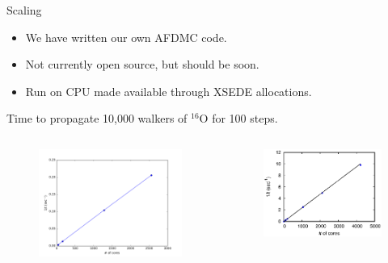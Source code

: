 \documentclass{beamer}
\begin{document}
\begin{frame}{Scaling}
\begin{itemize}
   \item We have written our own AFDMC code.
   \item Not currently open source, but should be soon.
   \item Run on CPU made available through XSEDE allocations.
\end{itemize}
{\small Time to propagate 10,000 walkers of $^{16}$O for 100 steps.}
\vspace{-0.5cm}
\begin{columns}
\begin{column}{0.5\textwidth}
\begin{figure}
   \includegraphics[width=\textwidth]{../figures/supermic.png}
\end{figure}
\end{column}
\hspace{-0.5cm}
\begin{column}{0.5\textwidth}
\vspace{0.5cm}
\begin{figure}
   \includegraphics[width=\textwidth]{../figures/stampede.eps}
\end{figure}
\end{column}
\end{columns}
\end{frame}
\end{document}
